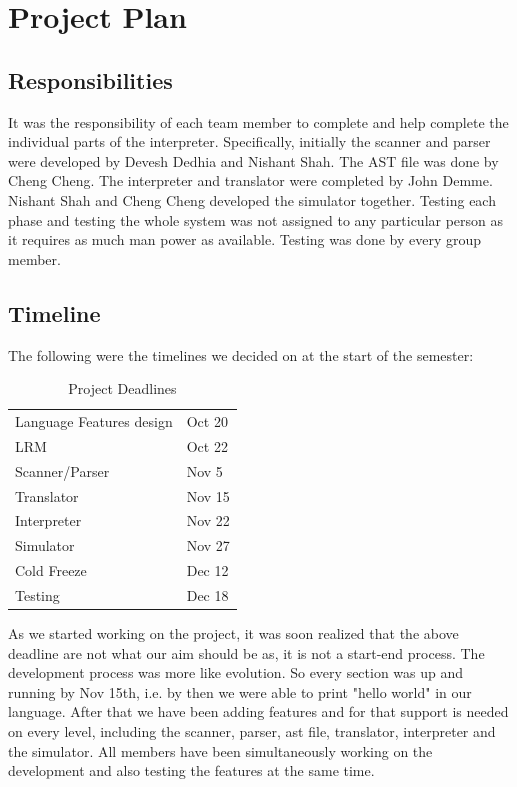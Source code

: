 \documentclass[onecolumn,titlepage]{article}
\begin{document}
\section{Project Plan}

\subsection{Responsibilities}

It was the responsibility of each team member to complete and help
complete the individual parts of the interpreter. Specifically,
initially the scanner and parser were developed by Devesh Dedhia and
Nishant Shah. The AST file was done by Cheng Cheng. The interpreter
and translator were completed by John Demme. Nishant Shah and Cheng
Cheng developed the simulator together. Testing each phase and testing
the whole system was not assigned to any particular person as it
requires as much man power as available. Testing was done by every
group member.

\subsection{Timeline}

The following were the timelines we decided on at the start of the
semester:

\begin{table}[h]
\caption{Project Deadlines}
\begin{center}
  \begin{tabular}{|l|l|}
    \hline
    Language Features design	& Oct 20 \\
    LRM				& Oct 22 \\
    Scanner/Parser		& Nov 5  \\
    Translator			& Nov 15 \\
    Interpreter			& Nov 22 \\
    Simulator			& Nov 27 \\
    Cold Freeze			& Dec 12 \\
    Testing                     & Dec 18 \\
    \hline
  \end{tabular}
\end{center}
\end{table}

As we started working on the project, it was soon realized that the
above deadline are not what our aim should be as, it is not a
start-end process. The development process was more like evolution. So
every section was up and running by Nov 15th, i.e. by then we were
able to print "hello world" in our language. After that we have been
adding features and for that support is needed on every level,
including the scanner, parser, ast file, translator, interpreter and
the simulator.  All members have been simultaneously working on the
development and also testing the features at the same time.
\end{document}
